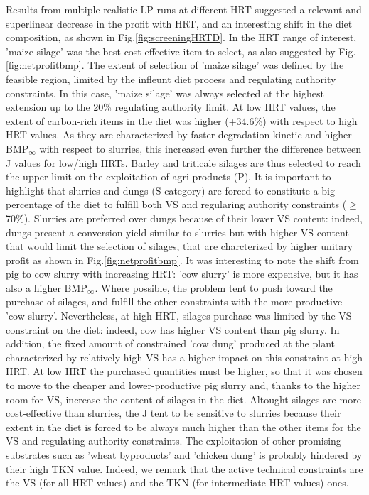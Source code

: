 Results from multiple realistic-LP runs at different HRT suggested a relevant and superlinear decrease in the profit with HRT, and an interesting shift in the diet composition, as shown in  Fig.\ref{fig:screeningHRTD}. 
In the HRT range of interest, 'maize silage' was the best cost-effective item to select, as also suggested by Fig.\ref{fig:netprofitbmp}. The extent of selection of 'maize silage' was defined by the feasible region, limited by the infleunt diet process and regulating authority constraints. In this case, 'maize silage' was always selected at the highest extension up to the 20\% regulating authority limit. At low HRT values, the extent of carbon-rich items in the diet was higher (+34.6\%) with respect to high HRT values. As they are characterized by faster degradation kinetic and higher BMP$_\infty$ with respect to slurries, this increased even further the difference between J values for low/high HRTs. Barley and triticale silages are thus selected to reach the upper limit on the exploitation of agri-products (P). 
It is important to highlight that slurries and dungs (S category) are forced to constitute a big percentage of the diet to fulfill both VS and regularing authority constraints ($\geq$ 70\%). Slurries are preferred over dungs because of their lower VS content: indeed, dungs present a conversion yield similar to slurries but with higher VS content that would limit the selection of silages, that are charcterized by higher unitary profit as shown in Fig.\ref{fig:netprofitbmp}.
It was interesting to note the shift from pig to cow slurry with increasing HRT: 'cow slurry' is more expensive, but it has also a higher BMP$_\infty$. 
Where possible, the problem tent to push toward the purchase of silages, and fulfill the other constraints with the more productive 'cow slurry'. Nevertheless, at high HRT, silages purchase was limited by the VS constraint on the diet: indeed, cow has higher VS content than pig slurry. In addition, the fixed amount of constrained 'cow dung' produced at the plant characterized by relatively high VS has a higher impact on this constraint at high HRT.
At low HRT the purchased quantities must be higher, so that it was chosen to move to the cheaper and lower-productive pig slurry and, thanks to the higher room for VS, increase the content of silages in the diet. 
Altought silages are more cost-effective than slurries, the J tent to be sensitive to slurries because their extent in the diet is forced to be always much higher than the other items for the VS and regulating authority constraints. The exploitation of other promising substrates such as 'wheat byproducts' and 'chicken dung' is probably hindered by their high TKN value.
Indeed, we remark that the active technical constraints are the VS (for all HRT values) and the TKN (for intermediate HRT values) ones.

